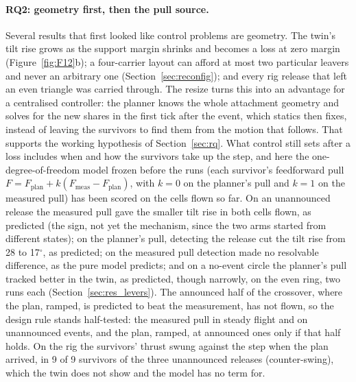 \paragraph{RQ2: geometry first, then the pull source.} Several results that first looked like control
problems are geometry. The twin's tilt rise grows as the support margin shrinks and becomes a loss at zero margin
(Figure~\ref{fig:F12}b); a four-carrier layout can afford at most two particular leavers and never an arbitrary one
(Section~\ref{sec:reconfig}); and every rig release that left an even triangle was carried through. The resize turns
this into an advantage for a centralised controller: the planner knows the whole attachment geometry and solves for
the new shares in the first tick after the event, which statics then fixes, instead of leaving the survivors to find
them from the motion that follows. That supports the working hypothesis of Section~\ref{sec:rq}. What control still
sets after a loss includes when and how the survivors take up the step, and here the one-degree-of-freedom model frozen
before the runs (each survivor's feedforward pull $F = F_{\mathrm{plan}} + k(F_{\mathrm{meas}} - F_{\mathrm{plan}})$, with $k = 0$
on the planner's pull and $k = 1$ on the measured pull) has been scored on the cells flown so far. On an unannounced
release the measured pull gave the smaller tilt rise in both cells flown, as predicted (the sign, not yet the
mechanism, since the two arms started from different states); on the planner's pull, detecting the release cut the tilt rise from 28 to 17$^\circ$,
as predicted; on the measured pull detection made no resolvable difference, as the pure model predicts; and on a
no-event circle the planner's pull tracked better in the twin, as predicted, though narrowly, on the even ring, two runs each
(Section~\ref{sec:res_levers}). The announced half of the crossover, where the plan,
ramped, is predicted to beat the measurement, has not flown, so the design rule stands half-tested: the measured pull
in steady flight and on unannounced events, and the plan, ramped, at announced ones only if that half holds. On the rig
the survivors' thrust swung against the step when the plan arrived, in 9 of 9 survivors of the three unannounced
releases (counter-swing), which the twin does not show and the model has no term for.

